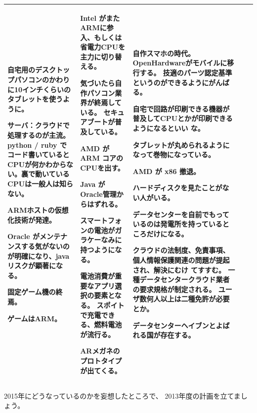 \documentclass[mingoth,a4paper]{jsarticle}
\begin{document}
{\begin{tabular}[t]{|p{8em}|p{12em}|p{12em}|p{8em}|p{9em}|}
自宅用のデスクトップパソコンのかわりに10インチくらいのタブレットを使うよ
	 うに。

サーバ：クラウドで処理するのが主流。python / ruby でコード書いていると
	 CPUが何かわからない。裏で動いているCPUは一般人は知らない。

ARMホストの仮想化技術が発達。

Oracle がメンテナンスする気がないのが明確になり、java リスクが顕著になる。

固定ゲーム機の終焉。

ゲームはARM。

 & 

Intel がまたARMに参入、もしくは省電力CPUを主力に切り替える。

気づいたら自作パソコン業界が終焉している。
セキュアブートが普及している。

AMD が ARM コアのCPUを出す。

Java が Oracle管理からはずれる。

スマートフォンの電池がガラケーなみに持つようになる。

電池消費が重要なアプリ選択の要素となる。
スポイトで充電できる、燃料電池が流行る。

ARメガネのプロトタイプが出てくる。

 & 

自作スマホの時代。
OpenHardwareがモバイルに移行する。
技適のパーツ認定基準というのができるようにがんばる。

自宅で回路が印刷できる機器が普及してCPUとかが印刷できるようになるといい
		 な。

タブレットが丸められるようになって巻物になっている。

AMD が x86 撤退。

ハードディスクを見たことがない人がいる。

データセンターを自前でもっているのは発電所を持っているところだけになる。

クラウドの法制度、免責事項、個人情報保護関連の問題が提起され、解決にむけ
		 てすすむ。
一種データセンタークラウド業者の要求規格が制定される。
ユーザ数何人以上は二種免許が必要とか。

データセンターヘイブンとよばれる国が存在する。

\\

\hline
\end{tabular}

}

2015年にどうなっているのかを妄想したところで、
2013年度の計画を立てましょう。
\end{document}

